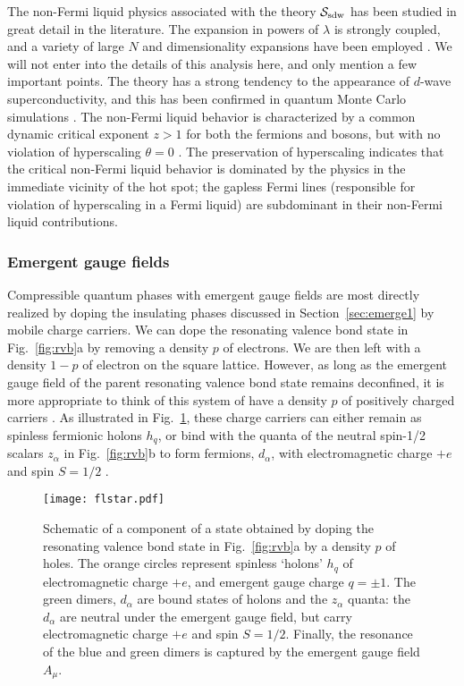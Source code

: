 \documentclass[10pt, oneside]{book}
\begin{document}
\begin{doublespace}
The non-Fermi liquid physics associated with the theory $\mathcal{S}_{{\rm sdw}}$ has been studied in great detail in the literature. The expansion in powers 
of $\lambda$ is strongly  coupled, and a variety of large $N$ and dimensionality expansions have been 
employed \cite{metlitski2,sungsik4,strack2}. We will not enter into the details of this
analysis here, and only mention a few important points. The theory has a strong tendency to the appearance of $d$-wave superconductivity, and this has
been confirmed in quantum Monte Carlo simulations \cite{metlitski4,berg1,fawang1,fawang2,scalettar1}. The non-Fermi liquid behavior is characterized by a common dynamic critical exponent $z>1$ 
for both the fermions and bosons, but with no violation of hyperscaling $\theta = 0$ \cite{metlitski3,strack1}. The preservation of hyperscaling indicates that the critical non-Fermi
liquid behavior is dominated by the physics in the immediate vicinity of the hot spot; the gapless Fermi lines (responsible for violation of hyperscaling 
in a Fermi liquid) are subdominant in their non-Fermi liquid contributions.

\subsubsection{Emergent gauge fields}
\label{sec:emerge2}

Compressible quantum phases with emergent gauge fields are most directly realized by doping the insulating phases discussed in Section~\ref{sec:emerge1}
by mobile charge carriers. We can dope the resonating valence bond state in Fig.~\ref{fig:rvb}a by removing a density $p$ of electrons. We are then left with a density
$1-p$ of electron on the square lattice. However, as long as the emergent gauge field of the parent resonating valence bond state remains deconfined, 
it is more appropriate to think of this system of have a density $p$ of positively charged carriers \cite{TSMVSS04,Punk15}. 
As illustrated in Fig.~\ref{fig:flstar}, these charge carriers can either
remain as spinless fermionic holons $h_q$, or bind with the quanta of the neutral spin-1/2 scalars $z_\alpha$ in Fig.~\ref{fig:rvb}b 
to form fermions, $d_\alpha$,  with electromagnetic charge $+e$
and spin $S=1/2$ \cite{RKK08}. 
\begin{figure}
\centering
\texttt{[image: flstar.pdf]}
\caption{\label{fig:flstar} Schematic of a component of a state obtained by doping the resonating valence bond state in Fig.~\ref{fig:rvb}a by a density $p$
of holes. The orange circles represent spinless `holons' $h_q$ of electromagnetic charge $+e$, and emergent gauge charge $q=\pm 1$.
The green dimers, $d_\alpha$ are bound states of holons and the $z_\alpha$ quanta: the $d_\alpha$ are neutral under the emergent gauge field,
but carry electromagnetic charge $+e$ and spin $S=1/2$. Finally, the resonance of the blue and green dimers is captured by the emergent gauge field $A_\mu$.}
\end{figure}


\end{doublespace}
\end{document}
